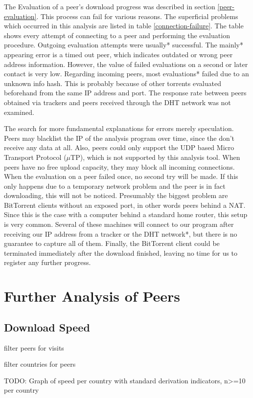 \documentclass[10pt, a4paper, twoside, headsepline]{scrbook}
\renewcommand{\_}{\origunderscore\allowbreak}
\begin{document}
The Evaluation of a peer's download progress was described in section \ref{peer-evaluation}. This process can fail for various reasons. The superficial problems which occurred in this analysis are listed in table \ref{connection-failure}. The table shows every attempt of connecting to a peer and performing the evaluation procedure. Outgoing evaluation attempts were usually* successful. The mainly* appearing error is a timed out peer, which indicates outdated or wrong peer address information. However, the value of failed evaluations on a second or later contact is very low. Regarding incoming peers, most evaluations* failed due to an unknown info hash. This is probably because of other torrents evaluated beforehand from the same IP address and port. The response rate between peers obtained via trackers and peers received through the DHT network was not examined.

The search for more fundamental explanations for errors merely speculation. Peers may blacklist the IP of the analysis program over time, since the don't receive any data at all. Also, peers could only support the UDP based Micro Transport Protocol ($\mu$TP), which is not supported by this analysis tool. When peers have no free upload capacity, they may block all incoming connections. When the evaluation on a peer failed once, no second try will be made. If this only happens due to a temporary network problem and the peer is in fact downloading, this will not be noticed. Presumably the biggest problem are BitTorrent clients without an exposed port, in other words peers behind a NAT. Since this is the case with a computer behind a standard home router, this setup is very common. Several of these machines will connect to our program after receiving our IP address from a tracker or the DHT network*, but there is no guarantee to capture all of them. Finally, the BitTorrent client could be terminated immediately after the download finished, leaving no time for us to register any further progress.

\section{Further Analysis of Peers}
\subsection{Download Speed}
filter peers for visits

filter countries for peers

TODO: Graph of speed per country with standard derivation indicators, n>=10 per country
\end{document}
